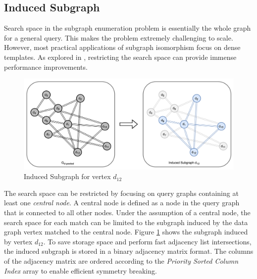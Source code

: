 \subsection{Induced Subgraph}\label{encoding}
Search space in the subgraph enumeration problem is essentially the whole graph for a general query.
This makes the problem extremely challenging to scale.
However, most practical applications of subgraph isomorphism focus on dense templates.
As explored in \cite{mohammad_K-clique}, restricting the search space can provide immense performance improvements.
\begin{figure}
    \includegraphics[width=\textwidth]{fig/LR/Induced-subgraph.png}
    \caption{Induced Subgraph for vertex $d_{12}$}
    \label{fig:induced-subgraph}
\end{figure}
The search space can be restricted by focusing on query graphs containing at least one \textit{central node}.
A central node is defined as a node in the query graph that is connected to all other nodes.
Under the assumption of a central node, the search space for each match can be limited to the subgraph induced by the data graph vertex matched to the central node.
Figure \ref{fig:induced-subgraph} shows the subgraph induced by vertex $d_{12}$.
To save storage space and perform fast adjacency list intersections, the induced subgraph is stored in a binary adjacency matrix format.
The columns of the adjacency matrix are ordered according to the \textit{Priority Sorted Column Index} array to enable efficient symmetry breaking.

